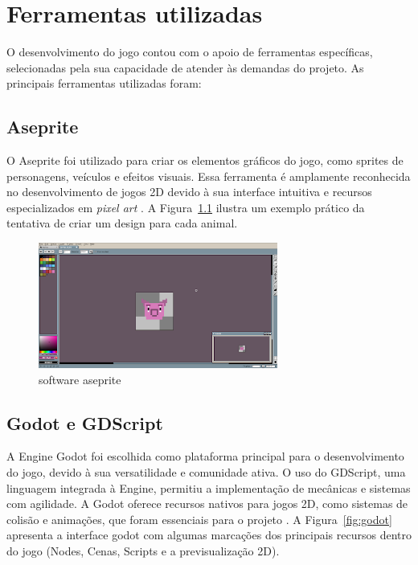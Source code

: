 \chapter[Ferramentas utilizadas]{Ferramentas utilizadas}

O desenvolvimento do jogo contou com o apoio de ferramentas específicas, selecionadas pela sua capacidade de atender às demandas do projeto. As principais ferramentas utilizadas foram:

\section{Aseprite}

O Aseprite foi utilizado para criar os elementos gráficos do jogo, como sprites de personagens, veículos e efeitos visuais. Essa ferramenta é amplamente reconhecida no desenvolvimento de jogos 2D devido à sua interface intuitiva e recursos especializados em \textit{pixel art} \cite{aseprite}. A Figura~\ref{fig:aseprite} ilustra um exemplo prático da tentativa de criar um design para cada animal. 

\begin{figure}[htbp]
    \centering
    \caption{software aseprite}
    \label{fig:aseprite}
    \includegraphics[width=0.7\textwidth]{figuras/asesprite.png}
\end{figure}

\section{Godot e GDScript}

A Engine Godot foi escolhida como plataforma principal para o desenvolvimento do jogo, devido à sua versatilidade e comunidade ativa. O uso do GDScript, uma linguagem integrada à Engine, permitiu a implementação de mecânicas e sistemas com agilidade. A Godot oferece recursos nativos para jogos 2D, como sistemas de colisão e animações, que foram essenciais para o projeto \cite{godot}. A Figura~\ref{fig:godot} apresenta a interface godot com algumas marcações dos principais recursos dentro do jogo (Nodes, Cenas, Scripts e a previsualização 2D).

